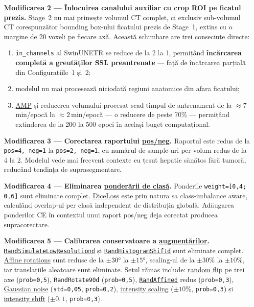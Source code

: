 \documentclass[12pt, a4paper]{report}
\begin{document}
\textbf{Modificarea 2 — Înlocuirea canalului auxiliar cu crop ROI pe ficatul prezis.}
Stage~2 nu mai primește volumul CT complet, ci exclusiv sub-volumul CT corespunzător
bounding box-ului ficatului prezis de Stage~1, extins cu o margine de 20 voxeli
pe fiecare axă. Această schimbare are trei consecințe directe:
\begin{enumerate}
    \item \texttt{in\_channels} al SwinUNETR se reduce de la 2 la 1, permițând
          \textbf{încărcarea completă a greutăților SSL preantrenate} — față de
          încărcarea parțială din Configurațiile~1 și~2;
    \item modelul nu mai procesează niciodată regiuni anatomice din afara ficatului;
    \item \hyperref[sec:amp]{AMP} și reducerea volumului procesat scad timpul de
          antrenament de la $\approx7$\,min/epocă la $\approx2$\,min/epocă
          — o reducere de peste 70\% — permițând extinderea de la 200 la 500 epoci
          în același buget computațional.
\end{enumerate}

\textbf{Modificarea 3 — Corectarea raportului \hyperref[sec:randcrop]{pos/neg}.}
Raportul este redus de la \texttt{pos=4, neg=1} la \texttt{pos=2, neg=1}, cu numărul
de sample-uri per volum redus de la 4 la 2. Modelul vede mai frecvent contexte cu
țesut hepatic sănătos fără tumoră, reducând tendința de suprasegmentare.

\textbf{Modificarea 4 — Eliminarea \hyperref[sec:classweights]{ponderării de clasă}.}
Ponderile \texttt{weight=[0,4;\,0,6]} sunt eliminate complet.
\hyperref[sec:diceloss]{DiceLoss} este prin natura sa class-imbalance aware,
calculând overlap-ul per clasă independent de distribuția globală. Adăugarea
ponderilor CE în contextul unui raport pos/neg deja corectat producea supracorectare.

\textbf{Modificarea 5 — Calibrarea conservatoare a
\hyperref[sec:aug_intensitate]{augmentărilor}.}
\newline
\hyperref[sec:lowres]{\texttt{RandSimulateLowResolutiond}} și
\hyperref[sec:histshift]{\texttt{RandHistogramShiftd}} sunt eliminate complet.
\hyperref[sec:randaffine]{Affine rotations} sunt reduse de la $\pm30°$ la $\pm15°$,
scaling-ul de la $\pm30\%$ la $\pm10\%$, iar translațiile aleatoare sunt eliminate.
Setul rămas include: \hyperref[sec:randflip]{random flip} pe trei axe
(\texttt{prob=0,5}), \texttt{RandRotate90d} (\texttt{prob=0,5}),
\hyperref[sec:randaffine]{\texttt{RandAffined}} redus (\texttt{prob=0,3}),
\hyperref[sec:gaussnoise]{Gaussian noise} (\texttt{std=0,05}, \texttt{prob=0,2}),
\hyperref[sec:scaleintensity]{intensity scaling} ($\pm10\%$, \texttt{prob=0,3})
și \hyperref[sec:shiftintensity]{intensity shift} ($\pm0{,}1$,
\texttt{prob=0,3}).
\end{document}
